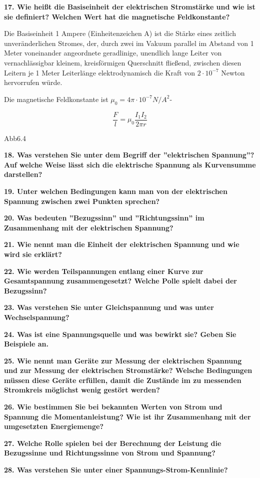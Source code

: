 \documentclass[12pt,a4paper,twoside]{book}
\newcommand{\nqu}[1]{\vspace*{10mm} \noindent \textbf{#1} \par \vspace*{1mm}}
\begin{document}
\nqu{17. Wie heißt die Basiseinheit der elektrischen Stromstärke und wie ist sie definiert? Welchen Wert hat die magnetische Feldkonstante?}
Die Basiseinheit 1 Ampere (Einheitenzeichen A) ist die Stärke eines zeitlich unveränderlichen Stromes, der, durch zwei im Vakuum parallel im Abstand von 1 Meter voneinander angeordnete geradlinige, unendlich lange Leiter von vernachlässigbar kleinem, kreisförmigen Querschnitt fließend, zwischen diesen Leitern je 1 Meter Leiterlänge elektrodynamisch die Kraft von $2\cdot 10^{-7}$ Newton hervorrufen würde.

Die magnetische Feldkonstante ist $\mu_0 = 4\pi \cdot 10^{-7} N/A^2$-

\[\frac{F}{l} = \mu_0\frac{I_1I_2}{2\pi r}\]

Abb6.4

\nqu{18. Was verstehen Sie unter dem Begriff der ''elektrischen Spannung''? Auf welche Weise lässt sich die elektrische Spannung als Kurvensumme darstellen?}


\nqu{19. Unter welchen Bedingungen kann man von der elektrischen Spannung zwischen zwei Punkten sprechen?}

\nqu{20. Was bedeuten ''Bezugssinn'' und ''Richtungssinn'' im Zusammenhang mit der elektrischen Spannung?}

\nqu{21. Wie nennt man die Einheit der elektrischen Spannung und wie wird sie erklärt?}

\nqu{22. Wie werden Teilspannungen entlang einer Kurve zur Gesamtspannung zusammengesetzt? Welche Polle spielt dabei der Bezugssinn?}

\nqu{23. Was verstehen Sie unter Gleichspannung und was unter Wechselspannung?}

\nqu{24. Was ist eine Spannungsquelle und was bewirkt sie? Geben Sie Beispiele an.}

\nqu{25. Wie nennt man Geräte zur Messung der elektrischen Spannung und zur Messung der elektrischen Stromstärke? Welsche Bedingungen müssen diese Geräte erfüllen, damit die Zustände im zu messenden Stromkreis möglichst wenig gestört werden?}

\nqu{26. Wie bestimmen Sie bei bekannten Werten von Strom und Spannung die Momentanleistung? Wie ist ihr Zusammenhang mit der umgesetzten Energiemenge?}

\nqu{27. Welche Rolle spielen bei der Berechnung der Leistung die Bezugssinne und Richtungssinne von Strom und Spannung?}

\nqu{28. Was verstehen Sie unter einer Spannungs-Strom-Kennlinie?}
\end{document}
